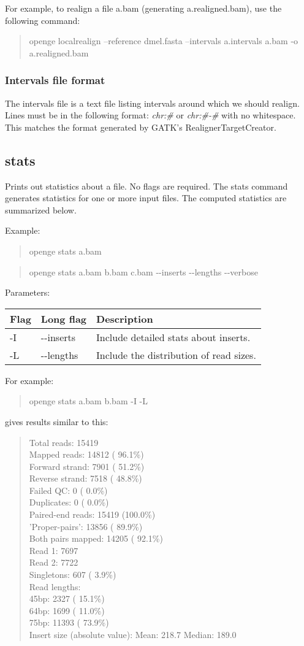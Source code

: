 \documentclass[11pt]{article}
\newcommand {\cmd}[1] {\begin{quote}#1\end{quote}}
\begin{document}
For example, to realign a file a.bam (generating a.realigned.bam), use the following command:
\cmd{openge localrealign --reference dmel.fasta --intervals a.intervals a.bam -o a.realigned.bam}

\subsubsection {Intervals file format}
The intervals file is a text file listing intervals around which we should realign. Lines must be in the following format:
\textit{chr:\#} or \textit{chr:\#-\#} with no whitespace. This matches the format generated by GATK's RealignerTargetCreator.

\subsection{stats}
Prints out statistics about a file. No flags are required.
The stats command generates statistics for one or more input files. The computed statistics are summarized below.

Example:

\cmd{openge stats a.bam}
\cmd{openge stats a.bam b.bam c.bam {-}{-}inserts {-}{-}lengths {-}{-}verbose}
Parameters:
\begin{center}
\begin{tabular}{llp{3.5in}}
\hline
Flag&Long flag&Description\\ \hline
-I&{-}{-}inserts&Include detailed stats about inserts.\\
-L&{-}{-}lengths&Include the distribution of read sizes.\\
\end{tabular}
\end{center}

For example:
\cmd {openge stats a.bam b.bam -I -L}
gives results similar to this:
\cmd {Total reads:            15419\\
Mapped reads:           14812 ( 96.1\%)\\
Forward strand:          7901 ( 51.2\%)\\
Reverse strand:          7518 ( 48.8\%)\\
Failed QC:                  0 (  0.0\%)\\
Duplicates:                 0 (  0.0\%)\\
Paired-end reads:       15419 (100.0\%)\\
'Proper-pairs':         13856 ( 89.9\%)\\
Both pairs mapped:      14205 ( 92.1\%)\\
Read 1:                  7697\\
Read 2:                  7722\\
Singletons:               607 (  3.9\%)\\
Read lengths:\\
    45bp:                2327 ( 15.1\%)\\
    64bp:                1699 ( 11.0\%)\\
    75bp:               11393 ( 73.9\%)\\
Insert size (absolute value):
    Mean:               218.7
    Median:             189.0}
\end{document}
